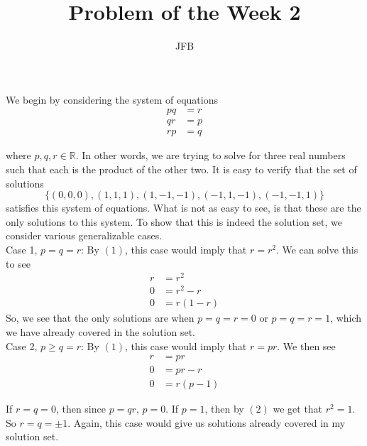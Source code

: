 \documentclass[12pt]{article}
\begin{document}
 
 
 
\title{Problem of the Week 2}%
\author{JFB} %
 
\maketitle

We begin by considering the system of equations
\begin{align}
    pq &= r \\
    qr &= p \\
    rp &= q
\end{align}

where $p,q,r \in \mathbb{R}$. In other words, we are trying to solve for three real numbers such that each is the product of the other two. It is easy to verify that the set of solutions $$\{(0,0,0), (1,1,1), (1,-1,-1), (-1,1,-1), (-1,-1,1)\}$$ satisfies this system of equations. What is not as easy to see, is that these are the only solutions to this system. To show that this is indeed the solution set, we consider various generalizable cases. \\

Case 1, $p = q = r$: By $(1)$, this case would imply that $r = r^2$. We can solve this to see
\begin{align*}
    r &= r^2 \\
    0 &= r^2 - r \\
    0 &= r(1-r)
\end{align*}
So, we see that the only solutions are when $p = q = r = 0$ or $p = q = r = 1$, which we have already covered in the solution set. \\

Case 2, $p \geq q = r$: By $(1)$, this case would imply that $r = pr$. We then see 
\begin{align*}
    r &= pr \\
    0 &= pr - r \\
    0 &= r(p-1)
\end{align*}

If $ r = q = 0$, then since $p = qr$, $p = 0$. If $p = 1$, then by $(2)$ we get that $r^2 = 1$. So $r = q = \pm 1$. Again, this case would give us solutions already covered in my solution set. \\
\end{document}
